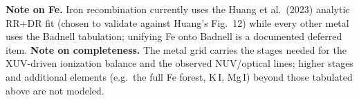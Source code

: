 \documentclass[english,a4paper]{kiseon_memo}
\begin{document}
\noindent
\textbf{Note on Fe.} Iron recombination currently uses the Huang et al.\ (2023)
analytic RR+DR fit (chosen to validate against Huang's Fig.~12) while every other
metal uses the Badnell tabulation; unifying Fe onto Badnell is a documented
deferred item. \textbf{Note on completeness.} The metal grid carries the stages
needed for the XUV-driven ionization balance and the observed NUV/optical lines;
higher stages and additional elements (e.g.\ the full Fe forest, K\,I, Mg\,I)
beyond those tabulated above are not modeled.
\end{document}
